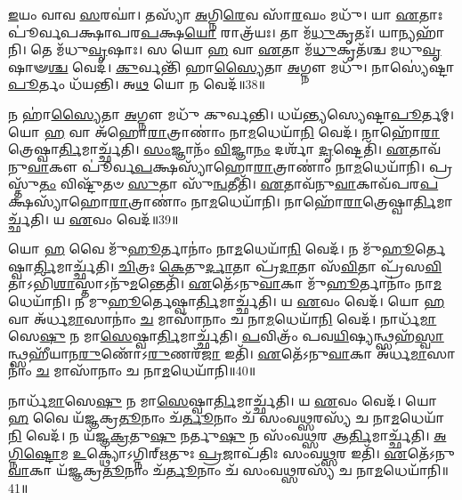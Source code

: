   \ul{𑌇}\-𑌯𑌂 𑌵𑌾𑌵 \ul{𑌸}\-𑌰𑌘𑌾॑।
   𑌤𑌸𑍍𑌯𑌾᳴ \ul{𑌅}\-𑌗𑍍𑌨𑌿\-\ul{𑌰𑍇}\-𑌵 𑌸𑌾᳴\-\ul{𑌰}\-𑌘𑌂 𑌮𑌧𑍁᳴।
   𑌯𑌾 \ul{𑌏}\-𑌤𑌾𑌃 𑌪𑍂॑𑌰𑍍𑌵𑌪𑌕𑍍𑌷𑌾𑌪𑌰\-\ul{𑌪}\-𑌕𑍍𑌷\-\ul{𑌯𑍋} 𑌰𑌾𑌤𑍍𑌰᳴𑌯𑌃।
   𑌤𑌾 𑌮᳴\-\ul{𑌧𑍁}\-𑌕𑍃𑌤𑌃᳴।
   𑌯𑌾𑌨𑍍𑌯𑌹𑌾᳴𑌨𑌿।
   𑌤𑍇 𑌮᳴𑌧𑍁\-\ul{𑌵𑍃}\-𑌷𑌾𑌃।
   𑌸 𑌯𑍋 \ul{𑌹} 𑌵𑌾 \ul{𑌏}\-𑌤𑌾 𑌮᳴\-\ul{𑌧𑍁}\-𑌕𑍃𑌤᳴𑌶𑍍𑌚 𑌮𑌧𑍁\-\ul{𑌵𑍃}\-𑌷𑌾𑍟\-\ul{𑌶𑍍𑌚} 𑌵𑍇𑌦᳴।
   \ul{𑌕𑍁}\-𑌰𑍍𑌵𑌨𑍍𑌤𑌿᳴ 𑌹𑌾\-\ul{𑌸𑍍𑌯𑍈}\-𑌤𑌾 \ul{𑌅}\-𑌗𑍍𑌨𑍗 𑌮𑌧𑍁᳴।
   𑌨𑌾𑌸𑍍𑌯𑍇॑𑌷𑍍𑌟𑌾\-\ul{𑌪𑍂}\-𑌰𑍍𑌤𑌂 𑌧᳴𑌯𑌨𑍍𑌤𑌿।
   𑌅\-\ul{𑌥} 𑌯𑍋 𑌨 𑌵𑍇𑌦᳴॥38॥

   𑌨 𑌹𑌾॑\-\ul{𑌸𑍍𑌯𑍈}\-𑌤𑌾 \ul{𑌅}\-𑌗𑍍𑌨𑍗 𑌮𑌧𑍁᳴ 𑌕𑍁𑌰𑍍𑌵𑌨𑍍𑌤𑌿।
   𑌧𑌯᳴𑌨𑍍𑌤𑍍𑌯𑌸𑍍𑌯𑍇𑌷𑍍𑌟𑌾\-\ul{𑌪𑍂}\-𑌰𑍍𑌤𑌮𑍍।
   𑌯𑍋 \ul{𑌹} 𑌵𑌾 𑌅᳴𑌹𑍋\-\ul{𑌰𑌾}\-𑌤𑍍𑌰𑌾𑌣𑌾𑌂॑ 𑌨𑌾\-\ul{𑌮}\-\-𑌧𑍇𑌯𑌾᳴\-\ul{𑌨𑌿} 𑌵𑍇𑌦᳴।
   𑌨𑌾𑌹𑍋᳴\-\ul{𑌰𑌾}\-𑌤𑍍𑌰𑍇𑌷𑍍𑌵𑌾\-\ul{𑌰𑍍𑌤𑌿}\-𑌮𑌾𑌰𑍍𑌚𑍍𑌛᳴𑌤𑌿।
   \ul{𑌸𑌂}\-𑌜𑍍𑌞𑌾𑌨𑌂᳴ \ul{𑌵𑌿}\-𑌜𑍍𑌞𑌾\-\ul{𑌨𑌂} 𑌦𑌰𑍍\mbox{}𑌶𑌾᳴ \ul{𑌦𑍃}\-𑌷𑍍𑌟𑍇𑌤𑌿᳴।
   \ul{𑌏}\-𑌤𑌾𑌵᳴𑌨𑍁\-\ul{𑌵𑌾}\-𑌕𑍗 𑌪𑍂॑𑌰𑍍𑌵\-\ul{𑌪}\-𑌕𑍍𑌷𑌸𑍍𑌯𑌾᳴\-𑌹𑍋\-\ul{𑌰𑌾}\-𑌤𑍍𑌰𑌾𑌣𑌾𑌂॑ 𑌨𑌾\-\ul{𑌮}\-\-𑌧𑍇𑌯𑌾᳴𑌨𑌿।
   𑌪𑍍𑌰𑌸𑍍𑌤𑍁᳴\-\ul{𑌤𑌂} 𑌵𑌿𑌷𑍍𑌟𑍁᳴𑌤𑍞 \ul{𑌸𑍁}\-𑌤𑌾 𑌸𑍁᳴\-\ul{𑌨𑍍𑌵}\-𑌤𑍀𑌤𑌿᳴।
   \ul{𑌏}\-𑌤𑌾𑌵᳴𑌨𑍁\-\ul{𑌵𑌾}\-𑌕𑌾𑌵᳴𑌪𑌰\-\-\ul{𑌪}\-𑌕𑍍𑌷\-𑌸𑍍𑌯𑌾᳴𑌹𑍋\-\ul{𑌰𑌾}\-𑌤𑍍𑌰𑌾𑌣𑌾𑌂॑ 𑌨𑌾\-\ul{𑌮}\-\-𑌧𑍇𑌯𑌾᳴𑌨𑌿।
   𑌨𑌾𑌹𑍋᳴\-\ul{𑌰𑌾}\-𑌤𑍍𑌰𑍇𑌷𑍍𑌵𑌾\-\ul{𑌰𑍍𑌤𑌿}\-𑌮𑌾𑌰𑍍𑌚𑍍𑌛᳴𑌤𑌿।
   𑌯 \ul{𑌏}\-𑌵𑌂 𑌵𑍇𑌦᳴॥39॥

   𑌯𑍋 \ul{𑌹} 𑌵𑍈 𑌮𑍁᳴\-\ul{𑌹𑍂}\-𑌰𑍍𑌤𑌾𑌨𑌾𑌂॑ 𑌨𑌾\-\ul{𑌮}\-\-𑌧𑍇𑌯𑌾᳴\-\ul{𑌨𑌿} 𑌵𑍇𑌦᳴।
   𑌨 𑌮𑍁᳴\-\ul{𑌹𑍂}\-𑌰𑍍𑌤𑍇𑌷𑍍𑌵𑌾\-\ul{𑌰𑍍𑌤𑌿}\-𑌮𑌾𑌰𑍍𑌚𑍍𑌛᳴𑌤𑌿।
   \ul{𑌚𑌿}\-𑌤𑍍𑌰𑌃 \ul{𑌕𑍇}\-𑌤𑍁\-\ul{𑌰𑍍𑌦𑌾}\-𑌤𑌾 𑌪𑍍𑌰᳴\-\ul{𑌦𑌾}\-𑌤𑌾 𑌸᳴\-\ul{𑌵𑌿}\-𑌤𑌾 𑌪𑍍𑌰᳴𑌸\-\ul{𑌵𑌿}\-𑌤𑌾𑌽𑌭𑌿᳴\-\ul{𑌶𑌾}\-𑌸𑍍𑌤𑌾𑌽𑌨𑍁᳴\-\-\ul{𑌮}\-𑌨𑍍𑌤𑍇𑌤𑌿᳴।
   \ul{𑌏}\-𑌤𑍇᳴𑌽𑌨𑍁\-\ul{𑌵𑌾}\-𑌕𑌾 𑌮𑍁᳴\-\ul{𑌹𑍂}\-𑌰𑍍𑌤𑌾𑌨𑌾𑌂॑ 𑌨𑌾\-\ul{𑌮}\-\-𑌧𑍇𑌯𑌾᳴𑌨𑌿।
   𑌨 𑌮𑍁\-\ul{𑌹𑍂}\-𑌰𑍍𑌤𑍇𑌷𑍍𑌵𑌾\-\ul{𑌰𑍍𑌤𑌿}\-𑌮𑌾𑌰𑍍𑌚𑍍𑌛᳴𑌤𑌿।
   𑌯 \ul{𑌏}\-𑌵𑌂 𑌵𑍇𑌦᳴।
   𑌯𑍋 \ul{𑌹} 𑌵𑌾 𑌅᳴𑌰𑍍𑌧\-\ul{𑌮𑌾}\-𑌸𑌾𑌨𑌾𑌂॑ \ul{𑌚} 𑌮𑌾𑌸𑌾᳴𑌨𑌾𑌂 𑌚 𑌨𑌾\-\ul{𑌮}\-\-𑌧𑍇𑌯𑌾᳴\-\ul{𑌨𑌿} 𑌵𑍇𑌦᳴।
   𑌨𑌾𑌰𑍍𑌧᳴\-\ul{𑌮𑌾}\-𑌸𑍇\-\ul{𑌷𑍁} 𑌨 𑌮𑌾\-\ul{𑌸𑍇}\-𑌷𑍍𑌵𑌾\-\ul{𑌰𑍍𑌤𑌿}\-𑌮𑌾𑌰𑍍𑌚𑍍𑌛᳴𑌤𑌿।
   \ul{𑌪}\-𑌵𑌿𑌤𑍍𑌰𑌂᳴ 𑌪𑌵\-\ul{𑌯𑌿}\-𑌷𑍍𑌯𑌨𑍍𑌥𑍍𑌸𑌹᳴\-\-\ul{𑌸𑍍𑌵𑌾}\-𑌨𑍍𑌥𑍍𑌸𑌹𑍀᳴𑌯𑌾𑌨\-\ul{𑌰𑍁}\-𑌣𑍋᳴𑌽\-\ul{𑌰𑍁}\-𑌣𑌰᳴\-\ul{𑌜𑌾} 𑌇𑌤𑌿᳴।
   \ul{𑌏}\-𑌤𑍇᳴𑌽𑌨𑍁\-\ul{𑌵𑌾}\-𑌕𑌾 𑌅᳴𑌰𑍍𑌧\-\ul{𑌮𑌾}\-𑌸𑌾𑌨𑌾𑌂॑ \ul{𑌚} 𑌮𑌾𑌸𑌾᳴𑌨𑌾𑌂 𑌚 𑌨𑌾\-\ul{𑌮}\-\-𑌧𑍇𑌯𑌾᳴𑌨𑌿॥40॥

   𑌨𑌾𑌰𑍍𑌧᳴\-\ul{𑌮𑌾}\-𑌸𑍇\-\ul{𑌷𑍁} 𑌨 𑌮𑌾\-\ul{𑌸𑍇}\-𑌷𑍍𑌵𑌾\-\ul{𑌰𑍍𑌤𑌿}\-𑌮𑌾𑌰𑍍𑌚𑍍𑌛᳴𑌤𑌿।
   𑌯 \ul{𑌏}\-𑌵𑌂 𑌵𑍇𑌦᳴।
   𑌯𑍋 \ul{𑌹} 𑌵𑍈 𑌯᳴𑌜𑍍𑌞𑌕𑍍𑌰\-\ul{𑌤𑍂}\-𑌨𑌾𑌂 𑌚᳴\-\ul{𑌰𑍍𑌤𑍂}\-𑌨𑌾𑌂 𑌚᳴ 𑌸𑌂𑌵\-\ul{𑌥𑍍𑌸}\-𑌰𑌸𑍍𑌯᳴ 𑌚 𑌨𑌾\-\ul{𑌮}\-\-𑌧𑍇𑌯𑌾᳴\-\ul{𑌨𑌿} 𑌵𑍇𑌦᳴।
   𑌨 𑌯᳴𑌜𑍍𑌞\-\ul{𑌕𑍍𑌰}\-𑌤𑍁\-\ul{𑌷𑍁} 𑌨𑌰𑍍𑌤𑍁\-\ul{𑌷𑍁} 𑌨 𑌸𑌂᳴𑌵\-\ul{𑌥𑍍𑌸}\-𑌰 𑌆\-\ul{𑌰𑍍𑌤𑌿}\-𑌮𑌾𑌰𑍍𑌚𑍍𑌛᳴𑌤𑌿।
   \ul{𑌅}\-\-\ul{𑌗𑍍𑌨𑌿}\-\-\ul{𑌷𑍍𑌟𑍋}\-𑌮 \ul{𑌉}\-𑌕𑍍𑌥𑍍𑌯𑍋॑𑌽𑌗𑍍𑌨𑌿𑌰𑍍{‌}\-\ul{𑌋}\-𑌤𑍁𑌃 \ul{𑌪𑍍𑌰}\-𑌜𑌾𑌪᳴𑌤𑌿𑌃 𑌸𑌂𑌵\-\ul{𑌥𑍍𑌸}\-𑌰 𑌇𑌤𑌿᳴।
   \ul{𑌏}\-𑌤𑍇᳴𑌽𑌨𑍁\-\ul{𑌵𑌾}\-𑌕𑌾 𑌯᳴𑌜𑍍𑌞𑌕𑍍𑌰\-\ul{𑌤𑍂}\-𑌨𑌾𑌂 𑌚᳴\-\ul{𑌰𑍍𑌤𑍂}\-𑌨𑌾𑌂 𑌚᳴ 𑌸𑌂𑌵\-\ul{𑌥𑍍𑌸}\-𑌰𑌸𑍍𑌯᳴ 𑌚 𑌨𑌾\-\ul{𑌮}\-\-𑌧𑍇𑌯𑌾᳴𑌨𑌿॥41॥

